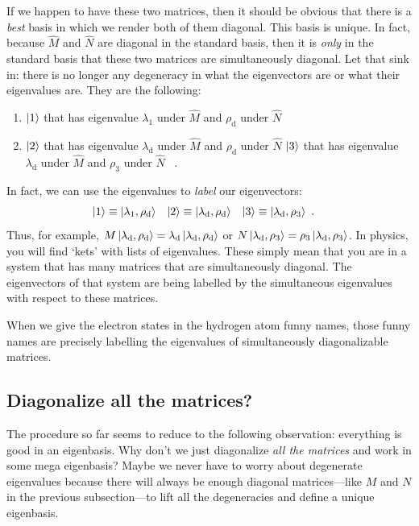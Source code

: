 \documentclass[12pt, oneside]{report}    %
\begin{document}
If we happen to have these two matrices, then it should be obvious that there is a \emph{best} basis in which we render both of them diagonal. This basis is unique. In fact, because $\hat M$ and $\hat N$ are diagonal in the standard basis, then it is \emph{only} in the standard basis that these two matrices are simultaneously diagonal. Let that sink in: there is no longer any degeneracy in what the eigenvectors are or what their eigenvalues are. They are the following:
\begin{enumerate}
    \item $\left|1\right\rangle$ that has eigenvalue $\lambda_1$ under $\hat M$ and $\rho_\text{d}$ under $\hat N$
    \item $\left|2\right\rangle$ that has eigenvalue $\lambda_\text{d}$ under $\hat M$ and $\rho_\text{d}$ under $\hat N$
    $\left|3\right\rangle$ that has eigenvalue $\lambda_\text{d}$ under $\hat M$ and $\rho_\text{3}$ under $\hat N$ \ .
\end{enumerate}
In fact, we can use the eigenvalues to \emph{label} our eigenvectors:
\begin{align}
    \left|1\right\rangle &\equiv \left|\lambda_1,\rho_\textnormal{d}\right\rangle
    &
    \left|2\right\rangle &\equiv \left|\lambda_\textnormal{d},\rho_\textnormal{d}\right\rangle
    &
    \left|3\right\rangle &\equiv \left|\lambda_\textnormal{d},\rho_3\right\rangle \ .
\end{align}
Thus, for example, $M\left|\lambda_\textnormal{d},\rho_\textnormal{d}\right\rangle = \lambda_\textnormal{d}\left|\lambda_\textnormal{d},\rho_\textnormal{d}\right\rangle$ or $N\left|\lambda_\textnormal{d},\rho_3\right\rangle = \rho_3\left|\lambda_\textnormal{d},\rho_3\right\rangle$.
In physics, you will find `kets' with lists of eigenvalues. These simply mean that you are in a system that has many matrices that are simultaneously diagonal. The eigenvectors of that system are being labelled by the simultaneous eigenvalues with respect to these matrices. 

\begin{example}
When we give the electron states in the hydrogen atom funny names, those funny names are precisely labelling the eigenvalues of simultaneously diagonalizable matrices.
\end{example}


\subsection*{Diagonalize all the matrices?}

The procedure so far seems to reduce to the following observation: everything is good in an eigenbasis. Why don't we just diagonalize \emph{all the matrices} and work in some mega eigenbasis? Maybe we never have to worry about degenerate eigenvalues because there will always be enough diagonal matrices---like $M$ and $N$ in the previous subsection---to lift all the degeneracies and define a unique eigenbasis.
\end{document}
